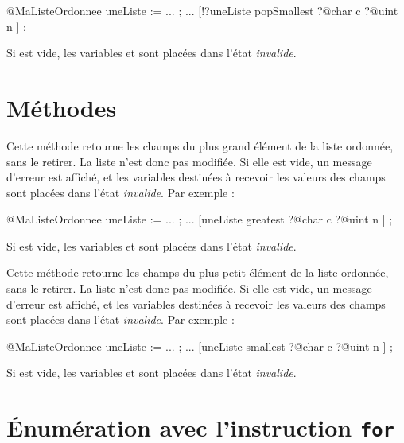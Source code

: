\begin{galgascode}
@MaListeOrdonnee uneListe := ... ;
...
[!?uneListe popSmallest
  ?@char c
  ?@uint n
] ;
\end{galgascode}

Si  est vide, les variables  et  sont placées dans l'état \emph{invalide}.










\section{Méthodes}


Cette méthode retourne les champs du plus grand élément de la liste ordonnée, sans le retirer. La liste n'est donc pas modifiée. Si elle est vide, un message d'erreur est affiché, et les variables destinées à recevoir les valeurs des champs sont placées dans l'état \emph{invalide}. Par exemple :

\begin{galgascode}
@MaListeOrdonnee uneListe := ... ;
...
[uneListe greatest
  ?@char c
  ?@uint n
] ;
\end{galgascode}

Si  est vide, les variables  et  sont placées dans l'état \emph{invalide}.



Cette méthode retourne les champs du plus petit élément de la liste ordonnée, sans le retirer. La liste n'est donc pas modifiée. Si elle est vide, un message d'erreur est affiché, et les variables destinées à recevoir les valeurs des champs sont placées dans l'état \emph{invalide}. Par exemple :

\begin{galgascode}
@MaListeOrdonnee uneListe := ... ;
...
[uneListe smallest
  ?@char c
  ?@uint n
] ;
\end{galgascode}

Si  est vide, les variables  et  sont placées dans l'état \emph{invalide}.




\section{Énumération avec l'instruction \texttt{for}}

